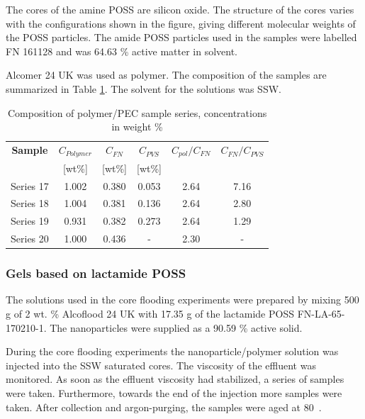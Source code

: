The cores of the amine POSS are silicon oxide. The structure of the cores varies with the configurations shown in the figure, giving different molecular weights of the POSS particles. The amide POSS particles used in the samples were labelled FN 161128 and was 64.63 \% active matter in solvent.

Alcomer 24 UK was used as polymer. The composition of the samples are summarized in Table \ref{tab:polyPecComp}. The solvent for the solutions was SSW.

\begin{table} 

\centering
\caption{Composition of polymer/PEC sample series, concentrations in weight \%}
\label{tab:polyPecComp}
\begin{tabular}{c c c c c c } 
\toprule
\textbf{Sample} & \textbf{$C_{Polymer}$} & \textbf{$C_{FN}$} & \textbf{$C_{PVS}$} & \textbf{$C_{pol}/C_{FN}$} & \textbf{$C_{FN}/C_{PVS}$} \\ 
&[wt\%]& [wt\%] & [wt\%] && \\
\midrule 
Series 17   & 1.002   & 0.380 & 0.053 & 2.64 & 7.16\\
Series 18   & 1.004   & 0.381 & 0.136 & 2.64 & 2.80\\ 
Series 19   & 0.931   & 0.382 & 0.273 & 2.64 & 1.29\\ 
Series 20   & 1.000   & 0.436 & - & 2.30     & - \\
\bottomrule
\end{tabular}
\end{table}

\subsubsection{Gels based on lactamide POSS}

 The solutions used in the core flooding experiments were prepared by mixing 500 g of 2 wt. \% Alcoflood 24 UK with 17.35 g of the lactamide POSS FN-LA-65-170210-1. The nanoparticles were supplied as a 90.59 \% active solid.

During the core flooding experiments the nanoparticle/polymer solution was injected into the SSW saturated cores. The viscosity of the effluent was monitored. As soon as the effluent viscosity had stabilized, a series of samples were taken. Furthermore, towards the end of the injection more samples were taken. After collection and argon-purging, the samples were aged at 80~\celsius. 

